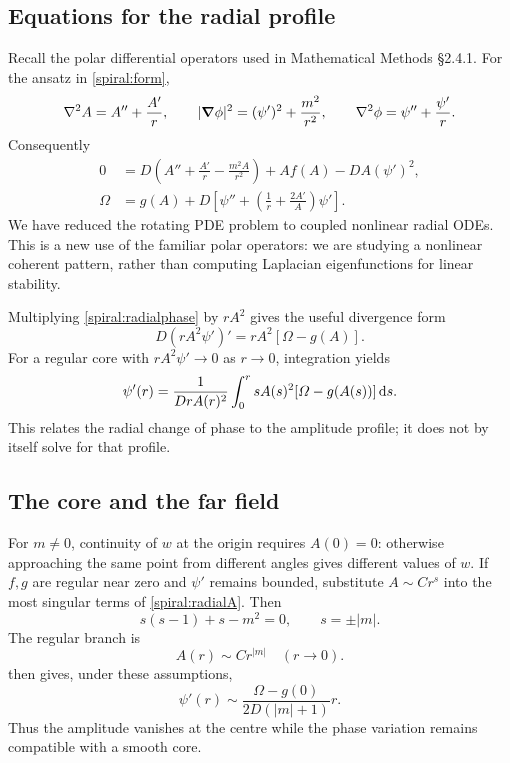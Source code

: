 \documentclass[main.tex]{subfiles}
\begin{document}
\subsection{Equations for the radial profile}
Recall the polar differential operators used in Mathematical Methods \S2.4.1. For the ansatz in \cref{spiral:form},
\[
\nabla^2A=A''+\frac{A'}r,\qquad
|\bm{\nabla}\phi|^2=(\psi')^2+\frac{m^2}{r^2},\qquad
\nabla^2\phi=\psi''+\frac{\psi'}r.
\]
Consequently
\begin{align}
0&=D\left(A''+\frac{A'}r-\frac{m^2A}{r^2}\right)
+Af(A)-DA(\psi')^2,\label{spiral:radialA}\\
\Omega&=g(A)+D\left[\psi''+\left(\frac1r+\frac{2A'}A\right)\psi'\right].\label{spiral:radialphase}
\end{align}
We have reduced the rotating PDE problem to coupled nonlinear radial ODEs. This is a new use of the familiar polar operators: we are studying a nonlinear coherent pattern, rather than computing Laplacian eigenfunctions for linear stability.

Multiplying \cref{spiral:radialphase} by $rA^2$ gives the useful divergence form
\[
D(rA^2\psi')'=rA^2[\Omega-g(A)].
\]
For a regular core with $rA^2\psi'\to0$ as $r\to0$, integration yields
\begin{equation}\label{spiral:integral}
\psi'(r)=\frac{1}{DrA(r)^2}\int_0^r sA(s)^2[\Omega-g(A(s))]\,\mathrm{d} s.
\end{equation}
This relates the radial change of phase to the amplitude profile; it does not by itself solve for that profile.

\subsection{The core and the far field}
For $m\ne0$, continuity of $w$ at the origin requires $A(0)=0$: otherwise approaching the same point from different angles gives different values of $w$. If $f,g$ are regular near zero and $\psi'$ remains bounded, substitute $A\sim Cr^s$ into the most singular terms of \cref{spiral:radialA}. Then
\[
s(s-1)+s-m^2=0,\qquad s=\pm|m|.
\]
The regular branch is
\begin{equation}
A(r)\sim Cr^{|m|}\quad (r\to0).
\end{equation}
 then gives, under these assumptions,
\[
\psi'(r)\sim\frac{\Omega-g(0)}{2D(|m|+1)}r.
\]
Thus the amplitude vanishes at the centre while the phase variation remains compatible with a smooth core.
\end{document}
